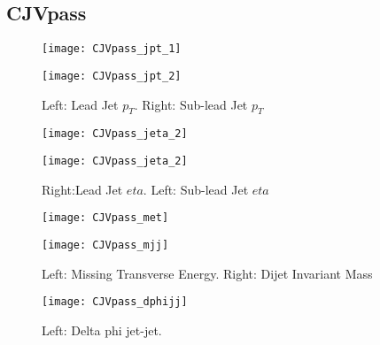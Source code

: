 \documentclass[a4paper,10pt]{article}
\begin{document}
\clearpage
\subsection{CJVpass}
  
\begin{figure}[!h]
\centering
\begin{minipage}[!h]{0.4\linewidth}
\centering
\texttt{[image: CJVpass\_jpt\_1]}
\end{minipage}%
\begin{minipage}[!h]{0.4\linewidth}
  \texttt{[image: CJVpass\_jpt\_2]}
\end{minipage}
\caption{Left: Lead Jet $p_T$. Right: Sub-lead Jet $p_T$}
\end{figure}

\begin{figure}[!h]
\centering
\begin{minipage}[!h]{0.4\linewidth}
\centering
\texttt{[image: CJVpass\_jeta\_2]}
\end{minipage}%
\begin{minipage}[!h]{0.4\linewidth}
\centering
\texttt{[image: CJVpass\_jeta\_2]}
\end{minipage}
\caption{Right:Lead Jet $eta$. Left: Sub-lead Jet $eta$}
\end{figure}

\begin{figure}[!h]
\centering
\begin{minipage}[!h]{0.4\linewidth}
\centering
\texttt{[image: CJVpass\_met]}
\end{minipage}%
\begin{minipage}[!h]{0.4\linewidth}
\centering
\texttt{[image: CJVpass\_mjj]}
\end{minipage}
\caption{Left: Missing Transverse Energy. Right: Dijet Invariant Mass}
\end{figure}

\begin{figure}[!h]
\centering
\begin{minipage}[!h]{0.4\linewidth}
\centering
\texttt{[image: CJVpass\_dphijj]}
\end{minipage}%
\begin{minipage}[!h]{0.4\linewidth}
\centering
\end{minipage}
\caption{Left: Delta phi jet-jet.}
\end{figure}
\end{document}
